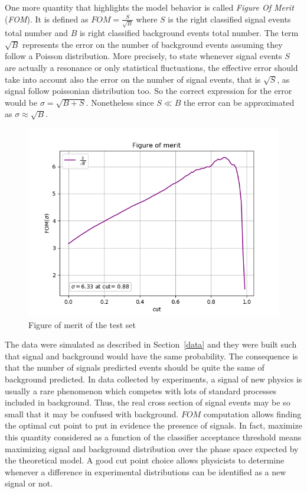 One more quantity that highlights the model behavior is called
\textit{Figure Of Merit} (\textit{FOM}). It is defined as
$FOM = \frac{S}{\sqrt{B}}$ where $S$ is the right classified signal events
total number and $B$ is right classified background events total number.
The term $\sqrt{B}$ represents the error on the number of background events
assuming they follow a Poisson distribution. More precisely, to state
whenever signal events $S$ are actually a resonance or only statistical
fluctuations, the effective error should take into account also the error on
the number of signal events, that is $\sqrt{S}$, as signal follow
poissonian distribution too. So the correct expression for the error would
be $\sigma = \sqrt{B + S}$. Nonetheless since $S \ll B$ the error can be
approximated as $\sigma \approx \sqrt{B}$.
\begin{figure}[h]
 \centering
 \includegraphics[scale=0.4]{figures/fom.png}
 \caption{Figure of merit of the test set}
\end{figure}

The data were simulated as described in Section~\ref{data} and they were
built such that signal and background would have the same probability.
The consequence is that the number of signals predicted events should be
quite the same of background predicted. In data collected by experiments, a
signal of new physics is usually a rare phenomenon which competes with
lots of standard processes included in background. Thus, the real cross
section of signal events may be so small that it may be confused with
background. $FOM$ computation allows finding the optimal cut point to
put in evidence the presence of signals. In fact, maximize this quantity
considered as a  function of the classifier acceptance threshold means
maximizing signal and background distribution over the phase space
expected by the theoretical model. A good cut point choice allows
physicists to determine whenever a difference in experimental
distributions can be identified as a new signal or not.

